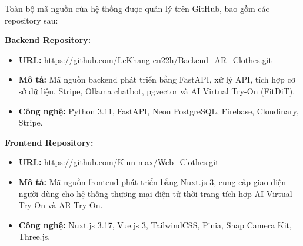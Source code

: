 Toàn bộ mã nguồn của hệ thống được quản lý trên GitHub, bao gồm 
các repository sau:

\textbf{Backend Repository:}
\begin{itemize}[noitemsep]
    \item \textbf{URL:} \url{https://github.com/LeKhang-cn22h/Backend_AR_Clothes.git}
    \item \textbf{Mô tả:} Mã nguồn backend phát triển bằng 
    FastAPI, xử lý API, tích hợp cơ sở dữ liệu, Stripe, 
    Ollama chatbot, pgvector và AI Virtual Try-On (FitDiT).
    \item \textbf{Công nghệ:} Python 3.11, FastAPI, 
    Neon PostgreSQL, Firebase, Cloudinary, Stripe.
\end{itemize}

\textbf{Frontend Repository:}
\begin{itemize}[noitemsep]
    \item \textbf{URL:} \url{https://github.com/Kinn-max/Web_Clothes.git}
    \item \textbf{Mô tả:} Mã nguồn frontend phát triển bằng 
    Nuxt.js 3, cung cấp giao diện người dùng cho hệ thống 
    thương mại điện tử thời trang tích hợp AI Virtual Try-On 
    và AR Try-On.
    \item \textbf{Công nghệ:} Nuxt.js 3.17, Vue.js 3, 
    TailwindCSS, Pinia, Snap Camera Kit, Three.js.
\end{itemize}